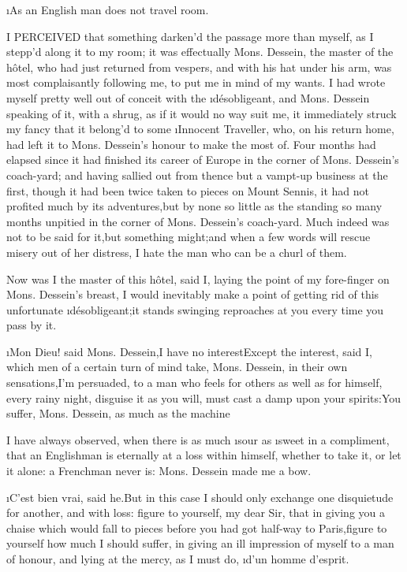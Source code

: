 \documentclass[twoside]{article}
\begin{document}
\tsk \i{As an English man does not travel}
room.

\newpage




I PERCEIVED that something darken’d the passage more than myself, as I
stepp’d along it to my room; it was effectually Mons. Dessein, the master
of the hôtel, who had just returned from vespers, and with his hat under
his arm, was most complaisantly following me, to put me in mind of my
wants.  I had wrote myself pretty well out of conceit with the
\i{désobligeant}, and Mons. Dessein speaking of it, with a shrug, as if it
would no way suit me, it immediately struck my fancy that it belong’d to
some \i{Innocent Traveller}, who, on his return home, had left it to Mons.
Dessein’s honour to make the most of.  Four months had elapsed since it
had finished its career of Europe in the corner of Mons. Dessein’s
coach-yard; and having sallied out from thence but a vampt-up business at
the first, though it had been twice taken to pieces on Mount Sennis, it
had not profited much by its adventures,\tsk but by none so little as the
standing so many months unpitied in the corner of Mons. Dessein’s
coach-yard.  Much indeed was not to be said for it,\tsk but something
might;\tsk and when a few words will rescue misery out of her distress, I
hate the man who can be a churl of them.

\tsk Now was I the master of this hôtel, said I, laying the point of my
fore-finger on Mons. Dessein’s breast, I would inevitably make a point of
getting rid of this unfortunate \i{désobligeant};\tsk it stands swinging
reproaches at you every time you pass by it.

\i{Mon Dieu}! said Mons. Dessein,\tsk I have no interest\tsk Except the interest,
said I, which men of a certain turn of mind take, Mons. Dessein, in their
own sensations,\tsk I’m persuaded, to a man who feels for others as well as
for himself, every rainy night, disguise it as you will, must cast a damp
upon your spirits:\tsk You suffer, Mons. Dessein, as much as the machine\tsk 

I have always observed, when there is as much \i{sour} as \i{sweet} in a
compliment, that an Englishman is eternally at a loss within himself,
whether to take it, or let it alone: a Frenchman never is: Mons. Dessein
made me a bow.

\i{C’est bien vrai}, said he.\tsk But in this case I should only exchange one
disquietude for another, and with loss: figure to yourself, my dear Sir,
that in giving you a chaise which would fall to pieces before you had got
half-way to Paris,\tsk figure to yourself how much I should suffer, in giving
an ill impression of myself to a man of honour, and lying at the mercy,
as I must do, \i{d’un homme d’esprit}.
\end{document}

